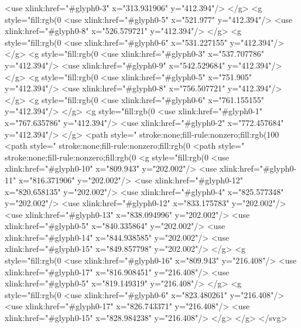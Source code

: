   <use xlink:href="#glyph0-3" x="313.931906" y="412.394"/>
</g>
<g style="fill:rgb(0%
  <use xlink:href="#glyph0-5" x="521.977" y="412.394"/>
  <use xlink:href="#glyph0-8" x="526.579721" y="412.394"/>
</g>
<g style="fill:rgb(0%
  <use xlink:href="#glyph0-6" x="531.227155" y="412.394"/>
</g>
<g style="fill:rgb(0%
  <use xlink:href="#glyph0-3" x="537.707786" y="412.394"/>
  <use xlink:href="#glyph0-9" x="542.529684" y="412.394"/>
</g>
<g style="fill:rgb(0%
  <use xlink:href="#glyph0-5" x="751.905" y="412.394"/>
  <use xlink:href="#glyph0-8" x="756.507721" y="412.394"/>
</g>
<g style="fill:rgb(0%
  <use xlink:href="#glyph0-6" x="761.155155" y="412.394"/>
</g>
<g style="fill:rgb(0%
  <use xlink:href="#glyph0-1" x="767.635786" y="412.394"/>
  <use xlink:href="#glyph0-2" x="772.457684" y="412.394"/>
</g>
<path style=" stroke:none;fill-rule:nonzero;fill:rgb(100%
<path style=" stroke:none;fill-rule:nonzero;fill:rgb(0%
<path style=" stroke:none;fill-rule:nonzero;fill:rgb(0%
<g style="fill:rgb(0%
  <use xlink:href="#glyph0-10" x="809.943" y="202.002"/>
  <use xlink:href="#glyph0-11" x="816.371906" y="202.002"/>
  <use xlink:href="#glyph0-12" x="820.658135" y="202.002"/>
  <use xlink:href="#glyph0-4" x="825.577348" y="202.002"/>
  <use xlink:href="#glyph0-12" x="833.175783" y="202.002"/>
  <use xlink:href="#glyph0-13" x="838.094996" y="202.002"/>
  <use xlink:href="#glyph0-5" x="840.335864" y="202.002"/>
  <use xlink:href="#glyph0-14" x="844.938585" y="202.002"/>
  <use xlink:href="#glyph0-15" x="849.857798" y="202.002"/>
</g>
<g style="fill:rgb(0%
  <use xlink:href="#glyph0-16" x="809.943" y="216.408"/>
  <use xlink:href="#glyph0-17" x="816.908451" y="216.408"/>
  <use xlink:href="#glyph0-5" x="819.149319" y="216.408"/>
</g>
<g style="fill:rgb(0%
  <use xlink:href="#glyph0-6" x="823.480261" y="216.408"/>
  <use xlink:href="#glyph0-17" x="826.743371" y="216.408"/>
  <use xlink:href="#glyph0-15" x="828.984238" y="216.408"/>
</g>
</g>
</svg>
